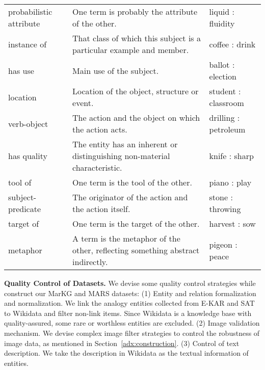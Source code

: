 \documentclass{article} \usepackage{iclr2023_conference,times}
\newcommand{\data}{MARS}
\newcommand{\kg}{MarKG}
\begin{document}
\begin{table*}[!htp]
{\begin{tabular}{lp{9.0cm}l}
probabilistic attribute & One term is probably the attribute of the other.  & liquid : fluidity \\
instance of & That class of which this subject is a particular example and member. & coffee : drink \\
has use & Main use of the subject.  & ballot : election \\
location & Location of the object, structure or event. & student : classroom \\
verb-object & The action and the object on which the action acts. & drilling : petroleum \\
has quality & The entity has an inherent or distinguishing non-material characteristic. & knife : sharp \\
tool of & One term is the tool of the other.  & piano : play \\
subject-predicate & The originator of the action and the action itself.  & stone : throwing \\
target of & One term is the target of the other. & harvest : sow \\
metaphor & A term is the metaphor of the other, reflecting something abstract indirectly. & pigeon : peace \\

\bottomrule
\end{tabular}
}
\caption{The complete relations with definitions, examples of {\data}. Some relations and definitions refer to~\citep{E-KAR} and Wikidata Properties.}
\label{tab:adx_complete_relation}
\end{table*}


\textbf{Quality Control of Datasets.}
We devise some quality control strategies while construct our {\kg} and {\data} datasets: 
(1) Entity and relation formalization and normalization. We link the analogy entities collected from E-KAR and SAT to Wikidata and filter non-link items.
Since Wikidata is a knowledge base with quality-assured, some rare or worthless entities are excluded.
(2) Image validation mechanism. We devise complex image filter strategies to control the robustness of image data, as mentioned in Section~\ref{adx:construction}.
(3) Control of text description. We take the description in Wikidata as the textual information of entities.
\end{document}
